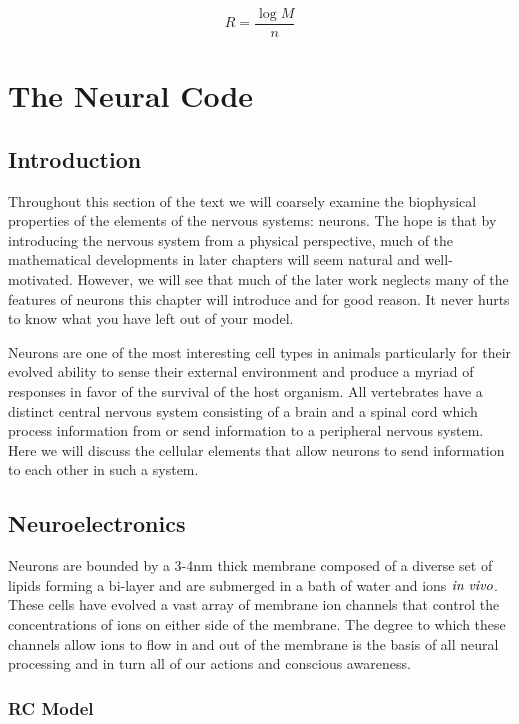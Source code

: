 \documentclass[a4paper,11pt]{book}
\begin{document}
\begin{equation*}
R = \frac{\log M}{n}
\end{equation*}

\chapter{The Neural Code}

\section{Introduction}

Throughout this section of the text we will coarsely examine the biophysical properties of the elements of the nervous systems: neurons. The hope is that by introducing the nervous system from a physical perspective, much of the mathematical developments in later chapters will seem natural and well-motivated. However, we will see that much of the later work neglects many of the features of neurons this chapter will introduce and for good reason. It never hurts to know what you have left out of your model.

Neurons are one of the most interesting cell types in animals particularly for their evolved ability to sense their external environment and produce a myriad of responses in favor of the survival of the host organism. All vertebrates have a distinct central nervous system consisting of a brain and a spinal cord which process information from or send information to a peripheral nervous system. Here we will discuss the cellular elements that allow neurons to send information to each other in such a system.

\section{Neuroelectronics}

Neurons are bounded by a 3-4nm thick membrane composed of a diverse set of lipids forming a bi-layer and are submerged in a bath of water and ions $\it{in \;vivo}$. These cells have evolved a vast array of membrane ion channels that control the concentrations of ions on either side of the membrane. The degree to which these channels allow ions to flow in and out of the membrane is the basis of all neural processing and in turn all of our actions and conscious awareness. 

\subsection{RC Model}
\end{document}
